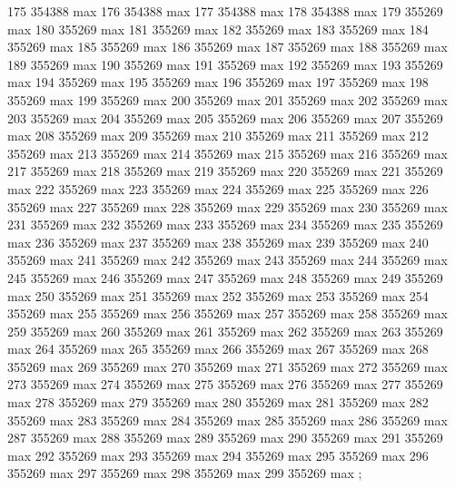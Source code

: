 {175 354388 max
176 354388 max
177 354388 max
178 354388 max
179 355269 max
180 355269 max
181 355269 max
182 355269 max
183 355269 max
184 355269 max
185 355269 max
186 355269 max
187 355269 max
188 355269 max
189 355269 max
190 355269 max
191 355269 max
192 355269 max
193 355269 max
194 355269 max
195 355269 max
196 355269 max
197 355269 max
198 355269 max
199 355269 max
200 355269 max
201 355269 max
202 355269 max
203 355269 max
204 355269 max
205 355269 max
206 355269 max
207 355269 max
208 355269 max
209 355269 max
210 355269 max
211 355269 max
212 355269 max
213 355269 max
214 355269 max
215 355269 max
216 355269 max
217 355269 max
218 355269 max
219 355269 max
220 355269 max
221 355269 max
222 355269 max
223 355269 max
224 355269 max
225 355269 max
226 355269 max
227 355269 max
228 355269 max
229 355269 max
230 355269 max
231 355269 max
232 355269 max
233 355269 max
234 355269 max
235 355269 max
236 355269 max
237 355269 max
238 355269 max
239 355269 max
240 355269 max
241 355269 max
242 355269 max
243 355269 max
244 355269 max
245 355269 max
246 355269 max
247 355269 max
248 355269 max
249 355269 max
250 355269 max
251 355269 max
252 355269 max
253 355269 max
254 355269 max
255 355269 max
256 355269 max
257 355269 max
258 355269 max
259 355269 max
260 355269 max
261 355269 max
262 355269 max
263 355269 max
264 355269 max
265 355269 max
266 355269 max
267 355269 max
268 355269 max
269 355269 max
270 355269 max
271 355269 max
272 355269 max
273 355269 max
274 355269 max
275 355269 max
276 355269 max
277 355269 max
278 355269 max
279 355269 max
280 355269 max
281 355269 max
282 355269 max
283 355269 max
284 355269 max
285 355269 max
286 355269 max
287 355269 max
288 355269 max
289 355269 max
290 355269 max
291 355269 max
292 355269 max
293 355269 max
294 355269 max
295 355269 max
296 355269 max
297 355269 max
298 355269 max
299 355269 max
};
